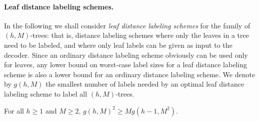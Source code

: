 \paragraph{Leaf distance labeling schemes.}
In the following we shall consider \emph{leaf distance labeling schemes} for the family of $(h,M)$-trees: that is, distance labeling schemes where only the leaves in a tree need to be labeled, and where only leaf labels can be given as input to the decoder. Since an ordinary distance labeling scheme obviously can be used only for leaves, any lower bound on worst-case label sizes for a leaf distance labeling scheme is also a lower bound for an ordinary distance labeling scheme. We denote by $g(h,M)$ the smallest number of labels needed by an optimal leaf distance labeling scheme to label all $(h,M)$-trees.
\begin{lemma} \label{lemm:distancehM}
For all $h\geq 1$ and $M\geq 2$, $g(h,M)^2\geq Mg(h-1,M^2)$.
\end{lemma}
